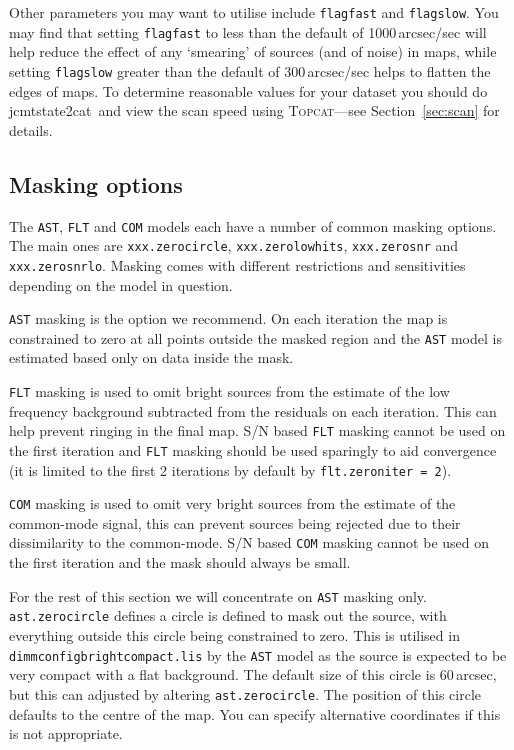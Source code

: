 \documentclass[twoside,11pt]{article}
\newcommand{\htmladdnormallink}[2]{#1}
\newcommand{\htmlref}[2]{#1}
\newcommand{\latexhtml}[2]{#1}
\newcommand{\xref}[3]{#1}
\newcommand{\xlabel}[1]{}
\renewcommand{\_}{\texttt{\symbol{95}}}
\newcommand{\topcat}{\htmladdnormallink{\textsc{Topcat}}{http://www.starlink.ac.uk/topcat}}
\newcommand{\task}[1]{\textsf{#1}}
\newcommand{\jcmtstate}{\xref{\task{jcmtstate2cat}}{sun258}{JCMTSTATE2CAT}}
\newcommand{\cref}[3]{\latexhtml{#1~\ref{#2}}{\htmlref{#3}{#2}}}
\begin{document}
Other parameters you may want to utilise include \texttt{flagfast} and
\texttt{flagslow}. You may find that setting \texttt{flagfast} to less
than the default of 1000\,arcsec/sec will help reduce the effect of any
`smearing' of sources (and of noise) in maps, while setting \texttt{flagslow} greater
than the default of 300\,arcsec/sec helps to flatten the edges of maps. To
determine reasonable values for your dataset you should do \jcmtstate\
and view the scan speed using \topcat---see
\cref{Section}{sec:scan}{Displaying scan patterns} for details.

\subsection{\xlabel{mask}Masking options}
\label{sec:mask}

The \texttt{AST}, \texttt{FLT} and \texttt{COM} models each have a
number of common masking options. The main ones are
\texttt{xxx.zero\_circle}, \texttt{xxx.zero\_lowhits},
\texttt{xxx.zero\_snr} and \texttt{xxx.zero\_snrlo}. Masking comes
with different restrictions and sensitivities depending on the model
in question.

\texttt{AST} masking is the option we recommend. On each iteration the
map is constrained to zero at all points outside the masked region and
the \texttt{AST} model is estimated based only on data inside the
mask.

\texttt{FLT} masking is used to omit bright sources from the estimate
of the low frequency background subtracted from the residuals on each
iteration. This can help prevent ringing in the final map. S/N based
\texttt{FLT} masking cannot be used on the first iteration and
\texttt{FLT} masking should be used sparingly to aid convergence (it
is limited to the first 2 iterations by default by
\texttt{flt.zero\_niter = 2}).

\texttt{COM} masking is used to omit very bright sources from the
estimate of the common-mode signal, this can prevent sources being
rejected due to their dissimilarity to the common-mode. S/N based
\texttt{COM} masking cannot be used on the first iteration and the
mask should always be small.

For the rest of this section we will concentrate on \texttt{AST}
masking only. \texttt{ast.zero\_circle} defines a circle is defined to
mask out the source, with everything outside this circle being
constrained to zero. This is utilised in
\texttt{dimmconfig\_bright\_compact.lis} by the \texttt{AST} model as
the source is expected to be very compact with a flat background. The
default size of this circle is 60\,arcsec, but this can adjusted by
altering \texttt{ast.zero\_circle}. The position of this circle
defaults to the centre of the map. You can specify alternative
coordinates if this is not appropriate.
\end{document}
